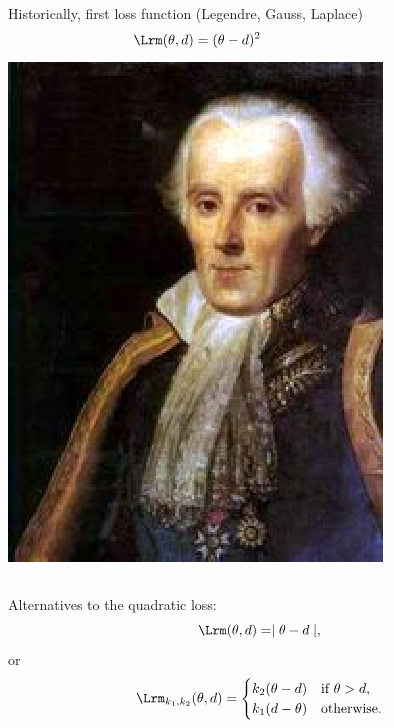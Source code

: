 \begin{slide}

\begin{columns}
Historically, first loss function (Legendre, Gauss, Laplace)
\[
	\Lrm (\theta ,d)  =  (\theta -d)^2
\]
\includegraphics[height=3truecm]{figures/Laplace}
\end{columns}



\pause{}

\end{slide}\begin{slide}

Alternatives to the quadratic loss:
\[
\Lrm(\theta,d)  =  \mid \theta-d\mid,
\]
or
\begin{eqnarray*}
\Lrm_{k_1,k_2} (\theta ,d)  =  \begin{cases} k_2(\theta -d) &
   \hbox{if }\theta  > d , \cr
			k_1(d-\theta )  & \hbox{otherwise.} \cr
			\end{cases}
\end{eqnarray*}


\end{slide}
